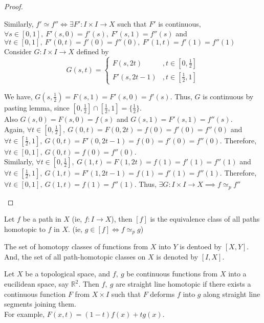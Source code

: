 \begin{proof}
\begin{enumerate}
			Similarly, $f' \simeq f'' \iff \exists F' : I \times I \to X$ such that $F'$ is continuous, $\forall s \in [0,1],\ F'(s,0)=f'(s),\ F'(s,1)=f''(s)$ and $\forall t \in [0,1],\ F'(0,t)=f'(0)=f''(0),\ F'(1,t)=f'(1)=f''(1)$\\

			Consider $G:I \times I \to X$ defined by \[ G(s,t) = \begin{cases} F(s,2t) & , t \in [0,\frac{1}{2}]\\ F'(s,2t-1) & , t \in [\frac{1}{2},1] \end{cases} \]
				
				We have, $G(s,\frac{1}{2}) = F(s,1) = F'(s,0) = f'(s)$.
				Thus, $G$ is continuous by pasting lemma\cite[\S{}18.3 pp. 106]{munkres}, since $[0,\frac{1}{2}] \cap [\frac{1}{2},1] = \{ \frac{1}{2}\}$.\\
			
			Also $G(s,0) = F(s,0) = f(s)$ and $G(s,1) = F'(s,1) = f''(s)$.\\

			Again, $\forall t \in [0,\frac{1}{2}],\ G(0,t) = F(0,2t) = f(0) = f'(0) = f''(0)$ and $\forall t \in [\frac{1}{2},1],\ G(0,t) = F'(0,2t-1) = f(0) = f'(0) = f''(0)$.
			Therefore, $\forall t \in [0,1],\ G(0,t) = f(0) = f''(0)$.\\
			
			Similarly, $\forall t \in [0,\frac{1}{2}],\ G(1,t) = F(1,2t) = f(1) = f'(1) = f''(1)$ and $\forall t \in [\frac{1}{2},1],\ G(1,t) = F'(1,2t-1) = f(1) = f'(1) = f''(1)$.
			Therefore, $\forall t \in [0,1],\ G(1,t) = f(1) = f''(1)$.
			Thus, $\exists G : I \times I \to X \implies f \simeq_p f''$
	\end{enumerate}
\end{proof}

\begin{definition}
	Let $f$ be a path in $X$ (ie, $f : I \to X$), then $[f]$ is the equivalence class of all paths homotopic to $f$ in $X$.
	(ie, $g \in [f] \iff f \simeq_p g$)
\end{definition}

\begin{remark}
	The set of homotopy classes of functions from $X$ into $Y$ is dentoed by $[X,Y]$.
	And, the set of all path-homotopic classes on $X$ is denoted by $[I,X]$.
\end{remark}

\begin{remark}\cite[\S{}51 Example 1 pp. 320]{munkres}
	Let $X$ be a topological space, and $f,\ g$ be continuous functions from $X$ into a eucilidean space, say $\mathbb{R}^2$.
	Then $f,\ g$ are straight line homotopic if there exists a continuous function $F$ from $X \times I$ such that $F$ deforms $f$ into $g$ along straight line segments joining them.\\

	For example, $F(x,t) = (1-t)f(x)+tg(x)$.
\end{remark}

